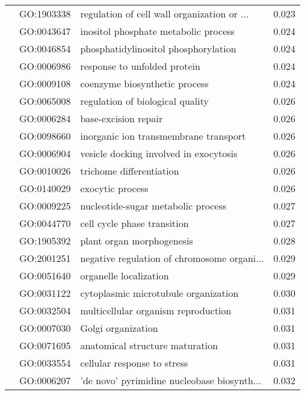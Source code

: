 \begin{longtable}{lllr}
   & GO:1903338 &  regulation of cell wall organization or ... &         0.023 \\
   & GO:0043647 &         inositol phosphate metabolic process &         0.024 \\
   & GO:0046854 &         phosphatidylinositol phosphorylation &         0.024 \\
   & GO:0006986 &                 response to unfolded protein &         0.024 \\
   & GO:0009108 &                coenzyme biosynthetic process &         0.024 \\
   & GO:0065008 &             regulation of biological quality &         0.026 \\
   & GO:0006284 &                         base-excision repair &         0.026 \\
   & GO:0098660 &        inorganic ion transmembrane transport &         0.026 \\
   & GO:0006904 &       vesicle docking involved in exocytosis &         0.026 \\
   & GO:0010026 &                     trichome differentiation &         0.026 \\
   & GO:0140029 &                             exocytic process &         0.026 \\
   & GO:0009225 &           nucleotide-sugar metabolic process &         0.027 \\
   & GO:0044770 &                  cell cycle phase transition &         0.027 \\
   & GO:1905392 &                    plant organ morphogenesis &         0.028 \\
   & GO:2001251 &  negative regulation of chromosome organi... &         0.029 \\
   & GO:0051640 &                       organelle localization &         0.029 \\
   & GO:0031122 &         cytoplasmic microtubule organization &         0.030 \\
   & GO:0032504 &          multicellular organism reproduction &         0.031 \\
   & GO:0007030 &                           Golgi organization &         0.031 \\
   & GO:0071695 &              anatomical structure maturation &         0.031 \\
   & GO:0033554 &                  cellular response to stress &         0.031 \\
   & GO:0006207 &  'de novo' pyrimidine nucleobase biosynth... &         0.032 \\

\end{longtable}
